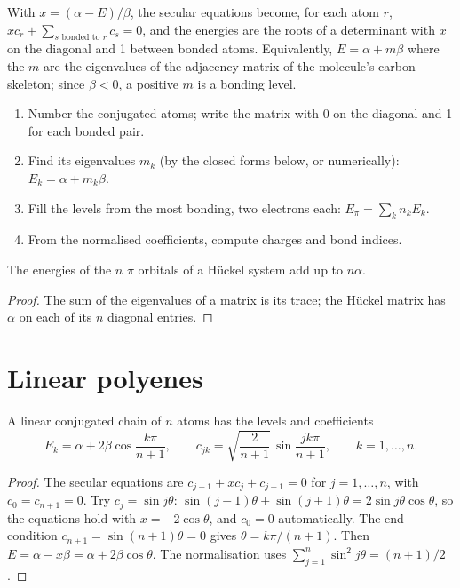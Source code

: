 With $x = (\alpha - E)/\beta$, the secular equations become, for each atom $r$,
$xc_r + \sum_{s \text{ bonded to } r} c_s = 0$, and the energies are the roots of a
determinant with $x$ on the diagonal and 1 between bonded atoms. Equivalently, $E =
\alpha + m\beta$ where the $m$ are the eigenvalues of the adjacency matrix of the
molecule's carbon skeleton; since $\beta < 0$, a positive $m$ is a bonding level.

\begin{method}\label{met:b2:huckel:huckel}
\begin{enumerate}
  \item Number the conjugated atoms; write the matrix with 0 on the diagonal and 1
        for each bonded pair.
  \item Find its eigenvalues $m_k$ (by the closed forms below, or numerically): $E_k =
        \alpha + m_k\beta$.
  \item Fill the levels from the most bonding, two electrons each:
        $E_\pi = \sum_k n_k E_k$.
  \item From the normalised coefficients, compute charges and bond indices.
\end{enumerate}
\end{method}

\begin{proposition}[Trace]\label{prop:b2:huckel:trace}
The energies of the $n$ $\pi$ orbitals of a Hückel system add up to $n\alpha$.
\end{proposition}

\begin{proof}
The sum of the eigenvalues of a matrix is its trace; the Hückel matrix has $\alpha$
on each of its $n$ diagonal entries.
\end{proof}

\section{Linear polyenes}

\begin{theorem}\label{thm:b2:huckel:polyene}
A linear conjugated chain of $n$ atoms has the levels and coefficients
\[
  E_k = \alpha + 2\beta\cos\frac{k\pi}{n + 1}, \qquad
  c_{jk} = \sqrt{\frac{2}{n + 1}}\,\sin\frac{jk\pi}{n + 1}, \qquad k = 1, \dots, n .
\]
\end{theorem}

\begin{proof}
The secular equations are $c_{j-1} + xc_j + c_{j+1} = 0$ for $j = 1, \dots, n$, with
$c_0 = c_{n+1} = 0$. Try $c_j = \sin j\theta$: $\sin(j - 1)\theta + \sin(j + 1)\theta = 2\sin
j\theta\cos\theta$, so the equations hold with $x = -2\cos\theta$, and $c_0 = 0$
automatically. The end condition $c_{n+1} = \sin(n + 1)\theta = 0$ gives $\theta =
k\pi/(n + 1)$. Then $E = \alpha - x\beta = \alpha + 2\beta\cos\theta$. The normalisation uses
$\sum_{j=1}^n\sin^2 j\theta = (n + 1)/2$.
\end{proof}

